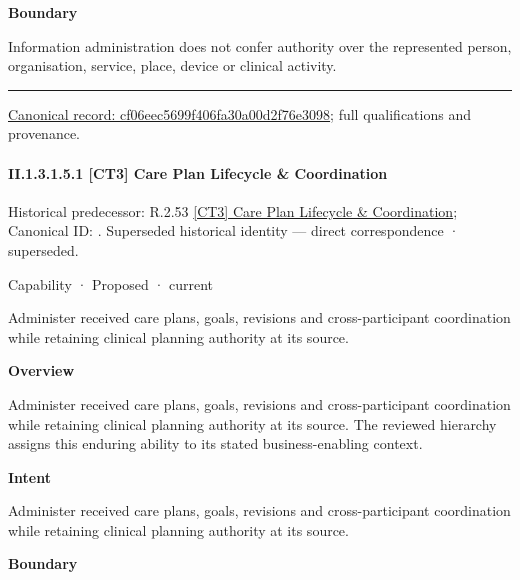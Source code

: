 \textbf{Boundary}



Information administration does not confer authority over the represented person, organisation, service, place, device or clinical activity.



\medskip\hrule\medskip

{\footnotesize \href{../../../../continuum/strategy/capability/cf06eec5699f406fa30a00d2f76e3098.md}{Canonical record: cf06eec5699f406fa30a00d2f76e3098}; full qualifications and provenance.}\par
\paragraph*{II.1.3.1.5.1 [CT3] Care Plan Lifecycle \& Coordination}
\label{navigation:II.1.3.1.5.1}

{\small Historical predecessor: R.2.53 \hyperref[element:689bb3f8a24249b79f787e1f48eb268d]{[CT3] Care Plan Lifecycle \& Coordination}; Canonical ID: \texttt{}. Superseded historical identity — direct correspondence · superseded.}\par
\label{element:4cb7db65392f4fab801d7794af4d4b29}
{\small Capability · Proposed · current}\par

Administer received care plans, goals, revisions and cross-participant coordination while retaining clinical planning authority at its source.



\textbf{Overview}



Administer received care plans, goals, revisions and cross-participant coordination while retaining clinical planning authority at its source. The reviewed hierarchy assigns this enduring ability to its stated business-enabling context.



\textbf{Intent}



Administer received care plans, goals, revisions and cross-participant coordination while retaining clinical planning authority at its source.



\textbf{Boundary}



